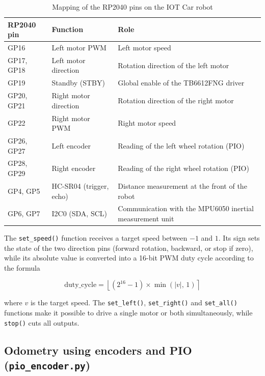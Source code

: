 \documentclass[12pt,a4paper]{report}
\begin{document}
	\begin{table}[H]
		\centering
		\small
		\renewcommand{\arraystretch}{1.15}
		\begin{tabularx}{\textwidth}{|l|l|X|}
			\hline
			\textbf{RP2040 pin} & \textbf{Function} & \textbf{Role} \\
			\hline
			GP16 & Left motor PWM & Left motor speed \\
			\hline
			GP17, GP18 & Left motor direction & Rotation direction of the left motor \\
			\hline
			GP19 & Standby (STBY) & Global enable of the TB6612FNG driver \\
			\hline
			GP20, GP21 & Right motor direction & Rotation direction of the right motor \\
			\hline
			GP22 & Right motor PWM & Right motor speed \\
			\hline
			GP26, GP27 & Left encoder & Reading of the left wheel rotation (PIO) \\
			\hline
			GP28, GP29 & Right encoder & Reading of the right wheel rotation (PIO) \\
			\hline
			GP4, GP5 & HC-SR04 (trigger, echo) & Distance measurement at the front of the robot \\
			\hline
			GP6, GP7 & I2C0 (SDA, SCL) & Communication with the MPU6050 inertial measurement unit \\
			\hline
		\end{tabularx}
		\caption{Mapping of the RP2040 pins on the IOT Car robot}
		\label{tab:pinout-robot}
	\end{table}
	
	The \texttt{set\_speed()} function receives a target speed between $-1$ and $1$. Its sign sets the state of the two direction pins (forward rotation, backward, or stop if zero), while its absolute value is converted into a 16-bit PWM duty cycle according to the formula
	
	\begin{equation}
		\text{duty\_cycle} = \left\lfloor \left(2^{16}-1\right) \times \min\left(|v|,\,1\right) \right\rceil
		\label{eq:pwm}
	\end{equation}
	
	where $v$ is the target speed. The \texttt{set\_left()}, \texttt{set\_right()} and \texttt{set\_all()} functions make it possible to drive a single motor or both simultaneously, while \texttt{stop()} cuts all outputs.
	
	\subsection*{Odometry using encoders and PIO (\texttt{pio\_encoder.py})}
	
\end{document}
